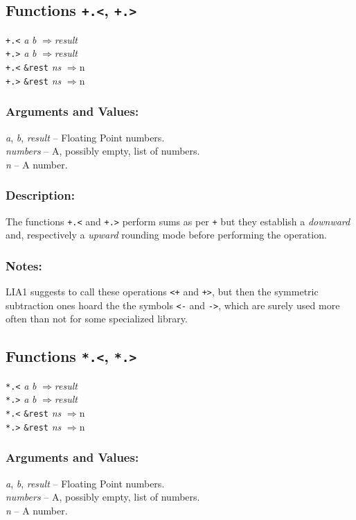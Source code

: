 \documentclass[10pt,fleqn]{article}
\newcommand{\code}[1]{\texttt{#1}}
\newcommand{\varname}[1]{\textit{#1}}
\newcommand{\RArrow}{$\Rightarrow$}
\newcommand{\DDictionaryItem}[1]{\vspace*{6pt}\noindent\hrulefill\vspace*{-9pt}\subsection*{#1}}
\newcommand{\DArgsNValues}{\subsubsection*{Arguments and Values:}}
\newcommand{\DDescription}{\subsubsection*{Description:}}
\newcommand{\DNotes}{\subsubsection*{Notes:}}
\begin{document}
\DDictionaryItem{Functions \code{+.<}, \code{+.>}}
\index{*!\code{+.<}}
\index{*!\code{+.>}}


\code{+.<} \varname{a} \varname{b} \RArrow \varname{result}\\
\code{+.>} \varname{a} \varname{b} \RArrow \varname{result}\\
\code{+.<} \code{\&rest} \varname{ns} \RArrow \varname \code{n}\\
\code{+.>} \code{\&rest} \varname{ns} \RArrow \varname \code{n}\\

\DArgsNValues{}

\varname{a}, \varname{b}, \varname{result} -- Floating Point numbers.\\
\varname{numbers} -- A, possibly empty, list of numbers.\\
\varname{n} -- A number.

\DDescription{}

The functions  \code{+.<} and \code{+.>} perform sums as per \code{+}
but they establish a \emph{downward} and, respectively a
\emph{upward} rounding mode before performing the operation.

\DNotes{}

LIA1 suggests to call these operations \code{<+} and \code{+>}, but
then the symmetric subtraction ones hoard the the symbols \code{<-}
and \code{->}, which are surely used more often than not for some
specialized library.


\DDictionaryItem{Functions \code{*.<}, \code{*.>}}
\index{*!\code{*.<}}
\index{*!\code{*.>}}


\code{*.<} \varname{a} \varname{b} \RArrow \varname{result}\\
\code{*.>} \varname{a} \varname{b} \RArrow \varname{result}\\
\code{*.<} \code{\&rest} \varname{ns} \RArrow \varname \code{n}\\
\code{*.>} \code{\&rest} \varname{ns} \RArrow \varname \code{n}\\

\DArgsNValues{}

\varname{a}, \varname{b}, \varname{result} -- Floating Point numbers.\\
\varname{numbers} -- A, possibly empty, list of numbers.\\
\varname{n} -- A number.
\end{document}
